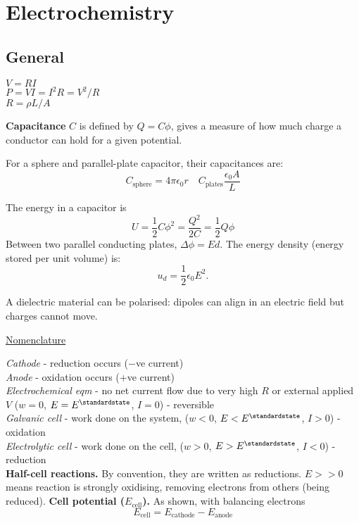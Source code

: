 \section{Electrochemistry}

\subsection*{General}
$V = RI$ \\
$P = VI = I^2R = V^2/R$ \\
$R = \rho L / A$

\textbf{Capacitance} $C$ is defined by $Q=C\phi$, gives a measure of how much charge a conductor can hold
for a given potential.

For a sphere and parallel-plate capacitor, their capacitances are:
\begin{equation*}
    C_{\textrm{sphere}} = 4 \pi \epsilon_0 r \quad C_{\textrm{plates}} \frac{\epsilon_0 A}{L}
\end{equation*}

The energy in a capacitor is
\begin{equation*}
    U = \frac{1}{2}C\phi^2 = \frac{Q^2}{2C} = \frac{1}{2}Q\phi
\end{equation*}
Between two parallel conducting plates, $\Delta \phi = Ed$. The energy density (energy stored per unit volume) is:
\begin{equation*}
    u_d = \frac{1}{2}\epsilon_0 E^2.
\end{equation*}

A dielectric material can be polarised: dipoles can align in an electric field
but charges cannot move.

\columnbreak
\underline{Nomenclature}

\textit{Cathode} - reduction occurs ($-$ve current)\\
\textit{Anode} - oxidation occurs  (+ve current)\\
\textit{Electrochemical eqm} - no net current flow due to very high $R$ or external applied $V$ ($w = 0$, $E = E^\standardstate$, $I = 0$) - reversible\\
\textit{Galvanic cell} - work done on the system, ($w < 0$, $E < E^\standardstate$, $I > 0$) - oxidation\\
\textit{Electrolytic cell} - work done on the cell, ($w > 0$, $E > E^\standardstate$, $I < 0$) - reduction\\
\textbf{Half-cell reactions.} By convention, they are written as reductions. $ E >> 0$
means reaction is strongly oxidising, removing electrons from others (being reduced).
\textbf{Cell potential ($E_{\mathrm{cell}}$).} As shown, with balancing electrons
\begin{equation*}
    E_{\mathrm{cell}} = E_{\mathrm{cathode}} - E_{\mathrm{anode}}
\end{equation*}
